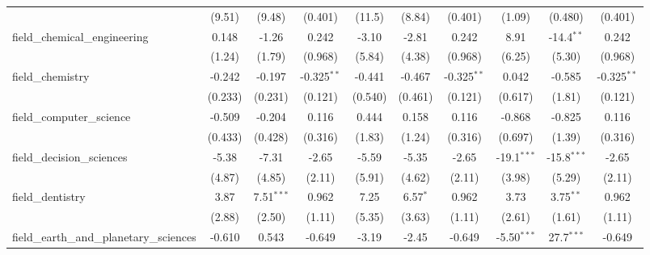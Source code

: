 \begin{tabular}{lccccccccc}
                                                               & (9.51)      & (9.48)        & (0.401)       & (11.5)   & (8.84)     & (0.401)       & (1.09)        & (0.480)       & (0.401)\\   
   field\_chemical\_engineering                                & 0.148       & -1.26         & 0.242         & -3.10    & -2.81      & 0.242         & 8.91          & -14.4$^{**}$  & 0.242\\   
                                                               & (1.24)      & (1.79)        & (0.968)       & (5.84)   & (4.38)     & (0.968)       & (6.25)        & (5.30)        & (0.968)\\   
   field\_chemistry                                            & -0.242      & -0.197        & -0.325$^{**}$ & -0.441   & -0.467     & -0.325$^{**}$ & 0.042         & -0.585        & -0.325$^{**}$\\   
                                                               & (0.233)     & (0.231)       & (0.121)       & (0.540)  & (0.461)    & (0.121)       & (0.617)       & (1.81)        & (0.121)\\   
   field\_computer\_science                                    & -0.509      & -0.204        & 0.116         & 0.444    & 0.158      & 0.116         & -0.868        & -0.825        & 0.116\\   
                                                               & (0.433)     & (0.428)       & (0.316)       & (1.83)   & (1.24)     & (0.316)       & (0.697)       & (1.39)        & (0.316)\\   
   field\_decision\_sciences                                   & -5.38       & -7.31         & -2.65         & -5.59    & -5.35      & -2.65         & -19.1$^{***}$ & -15.8$^{***}$ & -2.65\\   
                                                               & (4.87)      & (4.85)        & (2.11)        & (5.91)   & (4.62)     & (2.11)        & (3.98)        & (5.29)        & (2.11)\\   
   field\_dentistry                                            & 3.87        & 7.51$^{***}$  & 0.962         & 7.25     & 6.57$^{*}$ & 0.962         & 3.73          & 3.75$^{**}$   & 0.962\\   
                                                               & (2.88)      & (2.50)        & (1.11)        & (5.35)   & (3.63)     & (1.11)        & (2.61)        & (1.61)        & (1.11)\\   
   field\_earth\_and\_planetary\_sciences                      & -0.610      & 0.543         & -0.649        & -3.19    & -2.45      & -0.649        & -5.50$^{***}$ & 27.7$^{***}$  & -0.649\\   

\end{tabular}
